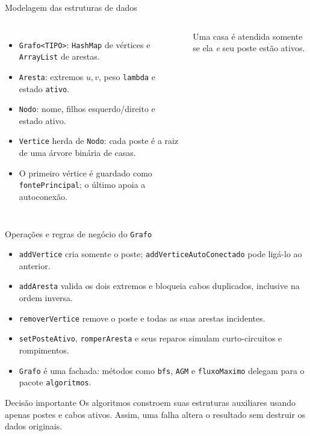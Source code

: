 \documentclass[aspectratio=169,10pt]{beamer}
\begin{document}
\begin{frame}{Modelagem das estruturas de dados}
\begin{columns}[T]
  \begin{itemize}
    \item \texttt{Grafo<TIPO>}: \texttt{HashMap} de vértices e \texttt{ArrayList} de arestas.
    \item \texttt{Aresta}: extremos $u,v$, peso \texttt{lambda} e estado \texttt{ativo}.
    \item \texttt{Nodo}: nome, filhos esquerdo/direito e estado ativo.
    \item \texttt{Vertice} herda de \texttt{Nodo}: cada poste é a raiz de uma árvore binária de casas.
    \item O primeiro vértice é guardado como \texttt{fontePrincipal}; o último apoia a autoconexão.
  \end{itemize}
  \centering

  \vspace{0.3cm}
  \small Uma casa é atendida somente se ela \emph{e} seu poste estão ativos.
\end{columns}
\end{frame}

\begin{frame}{Operações e regras de negócio do \texttt{Grafo}}
\begin{itemize}
  \item \texttt{addVertice} cria somente o poste; \texttt{addVerticeAutoConectado} pode ligá-lo ao anterior.
  \item \texttt{addAresta} valida os dois extremos e bloqueia cabos duplicados, inclusive na ordem inversa.
  \item \texttt{removerVertice} remove o poste e todas as suas arestas incidentes.
  \item \texttt{setPosteAtivo}, \texttt{romperAresta} e seus reparos simulam curto-circuitos e rompimentos.
  \item \texttt{Grafo} é uma fachada: métodos como \texttt{bfs}, \texttt{AGM} e \texttt{fluxoMaximo} delegam para o pacote \texttt{algoritmos}.
\end{itemize}
\begin{alertblock}{Decisão importante}
  Os algoritmos constroem suas estruturas auxiliares usando apenas postes e cabos ativos. Assim, uma falha altera o resultado sem destruir os dados originais.
\end{alertblock}
\end{frame}
\end{document}
